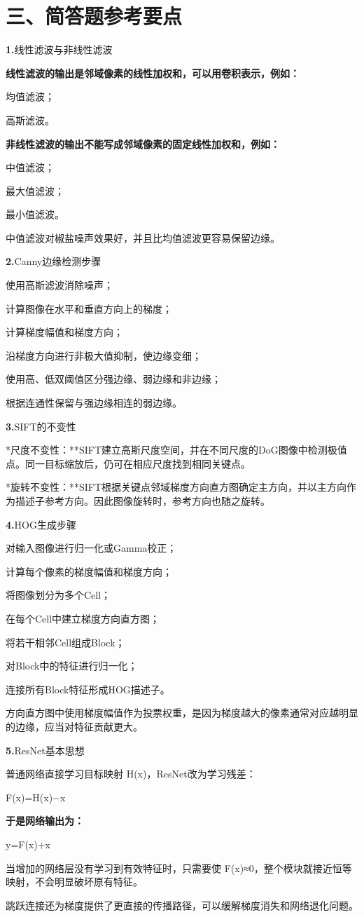\documentclass[UTF8,openany,oneside,zihao=-4,fontset=windows]{ctexbook}
\newcommand{\Question}[2]{%
  \par\Needspace{4\baselineskip}\medskip
  \noindent\textbf{\color{MVBlue}#1}\quad #2\par
}
\begin{document}
\section{三、简答题参考要点}
\Question{1.}{线性滤波与非线性滤波}
\par\noindent\textbf{线性滤波的输出是邻域像素的线性加权和，可以用卷积表示，例如：}
\par\noindent\textbullet\quad 均值滤波；
\par 高斯滤波。
\par\noindent\textbf{非线性滤波的输出不能写成邻域像素的固定线性加权和，例如：}
\par\noindent\textbullet\quad 中值滤波；
\par\noindent\textbullet\quad 最大值滤波；
\par 最小值滤波。
\par 中值滤波对椒盐噪声效果好，并且比均值滤波更容易保留边缘。
\Question{2.}{Canny边缘检测步骤}
\par\noindent\textbullet\quad 使用高斯滤波消除噪声；
\par\noindent\textbullet\quad 计算图像在水平和垂直方向上的梯度；
\par\noindent\textbullet\quad 计算梯度幅值和梯度方向；
\par\noindent\textbullet\quad 沿梯度方向进行非极大值抑制，使边缘变细；
\par\noindent\textbullet\quad 使用高、低双阈值区分强边缘、弱边缘和非边缘；
\par 根据连通性保留与强边缘相连的弱边缘。
\Question{3.}{SIFT的不变性}
\par **尺度不变性：**SIFT建立高斯尺度空间，并在不同尺度的DoG图像中检测极值点。同一目标缩放后，仍可在相应尺度找到相同关键点。
\par **旋转不变性：**SIFT根据关键点邻域梯度方向直方图确定主方向，并以主方向作为描述子参考方向。因此图像旋转时，参考方向也随之旋转。
\Question{4.}{HOG生成步骤}
\par\noindent\textbullet\quad 对输入图像进行归一化或Gamma校正；
\par\noindent\textbullet\quad 计算每个像素的梯度幅值和梯度方向；
\par\noindent\textbullet\quad 将图像划分为多个Cell；
\par\noindent\textbullet\quad 在每个Cell中建立梯度方向直方图；
\par\noindent\textbullet\quad 将若干相邻Cell组成Block；
\par\noindent\textbullet\quad 对Block中的特征进行归一化；
\par 连接所有Block特征形成HOG描述子。
\par 方向直方图中使用梯度幅值作为投票权重，是因为梯度越大的像素通常对应越明显的边缘，应当对特征贡献更大。
\Question{5.}{ResNet基本思想}
\par 普通网络直接学习目标映射 H(x)，ResNet改为学习残差：
\par F(x)=H(x)−x
\par\noindent\textbf{于是网络输出为：}
\par y=F(x)+x
\par 当增加的网络层没有学习到有效特征时，只需要使 F(x)≈0，整个模块就接近恒等映射，不会明显破坏原有特征。
\par 跳跃连接还为梯度提供了更直接的传播路径，可以缓解梯度消失和网络退化问题。
\end{document}
